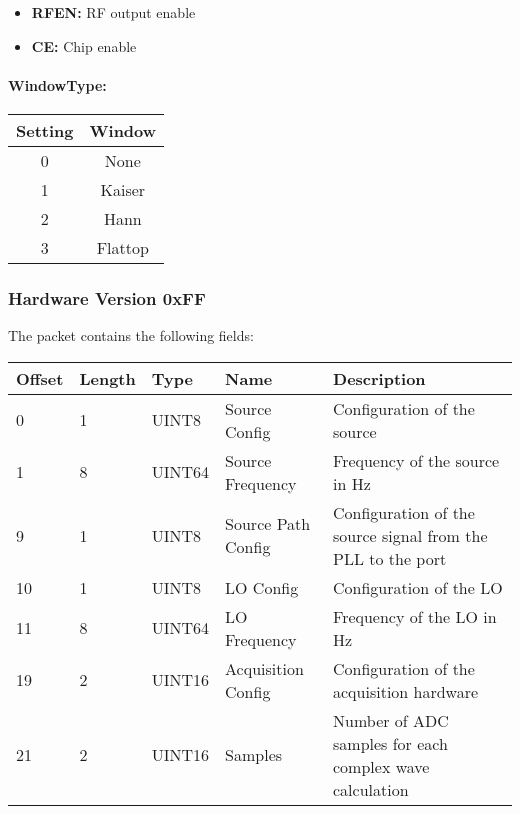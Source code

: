 \documentclass[a4paper,11pt]{article}
\begin{document}
\begin{itemize}
\item \textbf{RFEN:} RF output enable
\item \textbf{CE:} Chip enable
\end{itemize}

\paragraph{WindowType:}
\begin{center}
\begin{tabular}{ c|c }
Setting & Window\\
 \hline
0 & None \\
1 & Kaiser\\
2 & Hann\\
3 & Flattop\\
\end{tabular}
\end{center}

\subsubsection{Hardware Version 0xFF}
The packet contains the following fields:
\begin{ThreePartTable}
\setlength\tabcolsep{3pt}

\begin{longtable}{p{} |  p{}  |  p{}| p{} | p{}}
\toprule
\textbf{Offset} &\textbf{Length} &\textbf{Type} & \textbf{Name} &\textbf{Description} \\ 
\hline
\endhead
\midrule[\heavyrulewidth]
\endfoot  
\midrule[\heavyrulewidth]
\endlastfoot

0 & 1 & UINT8 & Source Config & Configuration of the source \\
1 & 8 & UINT64 & Source Frequency & Frequency of the source in Hz \\
9 & 1 & UINT8 & Source Path Config & Configuration of the source signal from the PLL to the port \\
10 & 1 & UINT8 & LO Config & Configuration of the LO \\
11 & 8 & UINT64 & LO Frequency & Frequency of the LO in Hz \\
19 & 2 & UINT16 & Acquisition Config & Configuration of the acquisition hardware \\
21 & 2 & UINT16 & Samples & Number of ADC samples for each complex wave calculation \\
\end{longtable}   
\end{ThreePartTable}
\end{document}
